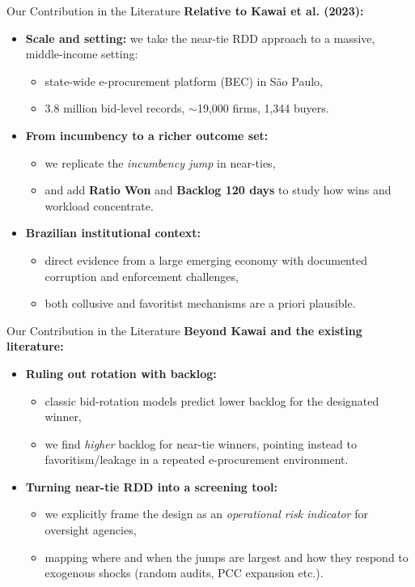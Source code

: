 \documentclass[aspectratio=169]{beamer}
\begin{document}
\begin{frame}{Our Contribution in the Literature}
\textbf{Relative to Kawai et al. (2023):}
\begin{itemize}
  \item \textbf{Scale and setting:} we take the near-tie RDD approach to a massive, middle-income setting:
  \begin{itemize}
    \item state-wide e-procurement platform (BEC) in S\~ao Paulo,
    \item 3.8 million bid-level records, $\sim$19,000 firms, 1,344 buyers.
  \end{itemize}
  \item \textbf{From incumbency to a richer outcome set:}
  \begin{itemize}
    \item we replicate the \emph{incumbency jump} in near-ties,
    \item and add \textbf{Ratio Won} and \textbf{Backlog 120 days} to study how wins and workload concentrate.
  \end{itemize}
  \item \textbf{Brazilian institutional context:}
  \begin{itemize}
    \item direct evidence from a large emerging economy with documented corruption and enforcement challenges,
    \item both collusive and favoritist mechanisms are a priori plausible.
  \end{itemize}
\end{itemize}
\end{frame}


\begin{frame}{Our Contribution in the Literature}
\textbf{Beyond Kawai and the existing literature:}
\begin{itemize}
   \item \textbf{Ruling out rotation with backlog:}
  \begin{itemize}
    \item classic bid-rotation models predict lower backlog for the designated winner,
    \item we find \emph{higher} backlog for near-tie winners, pointing instead to favoritism/leakage in a repeated e-procurement environment.
  \end{itemize}
  \item \textbf{Turning near-tie RDD into a screening tool:}
  \begin{itemize}
    \item we explicitly frame the design as an \emph{operational risk indicator} for oversight agencies,
    \item mapping where and when the jumps are largest and how they respond to\\ exogenous shocks (random audits, PCC expansion etc.).
  \end{itemize}
\end{itemize}
\end{frame}
\end{document}
